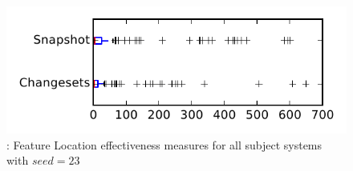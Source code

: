 
\begin{figure}
\centering
\includegraphics[height=0.4\textheight]{figures/flt_seed/rq1_tiny_23}
\caption{\rone: Feature Location effectiveness measures for all subject systems with $seed=23$}
\label{fig:flt_seed:rq1:tiny}
\end{figure}
